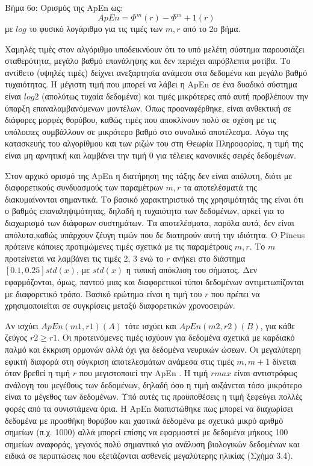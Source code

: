 \par
Βήμα 6ο: Ορισμός της \en ApEn \gr ως:
\begin{equation}
	ApEn = \Phi^m (r) - \Phi^m+1 (r)
\end{equation}
με $log$ το φυσικό λογάριθμο για τις τιμές των $m, r$ από το 2ο βήμα.
\par 
Χαμηλές τιμές στον αλγόριθμο υποδεικνύουν ότι το υπό μελέτη σύστημα παρουσιάζει σταθερότητα, μεγάλο βαθμό επανάληψης και δεν περιέχει απρόβλεπτα μοτίβα. Το αντίθετο (υψηλές τιμές) δείχνει ανεξαρτησία ανάμεσα στα δεδομένα και μεγάλο βαθμό τυχαιότητας. Η μέγιστη τιμή που μπορεί να λάβει η \en ApEn \gr σε ένα δυαδικό σύστημα είναι $log2$ (απολύτως τυχαία δεδομένα) και τιμές μικρότερες από αυτή προβλέπουν την ύπαρξη επαναλαμβανόμενων μοντέλων. Όπως προαναφέρθηκε, είναι ανθεκτική σε διάφορες μορφές θορύβου, καθώς τιμές που αποκλίνουν πολύ σε σχέση με τις υπόλοιπες συμβάλλουν σε μικρότερο βαθμό στο συνολικό αποτέλεσμα. Λόγω της κατασκευής του αλγορίθμου και των ριζών του στη Θεωρία Πληροφορίας, η τιμή της είναι μη αρνητική και λαμβάνει την τιμή 0 για τέλειες κανονικές σειρές δεδομένων.
\par
Στον αρχικό ορισμό της \en ApEn \gr η διατήρηση της τάξης δεν είναι απόλυτη, διότι με διαφορετικούς  συνδυασμούς των παραμέτρων $ m, r$ τα αποτελέσματά της διακυμαίνονται σημαντικά. Το βασικό χαρακτηριστικό της χρησιμότητάς της είναι ότι ο βαθμός επαναληψιμότητας, δηλαδή η τυχαιότητα των δεδομένων, αρκεί για το διαχωρισμό των διάφορων συστημάτων. Τα αποτελέσματα, παρόλα αυτά, δεν είναι απόλυτα,καθώς υπάρχουν ζέυγη τιμών που δε διατηρούν αυτή την ιδιότητα. Ο \en Pincus \gr πρότεινε κάποιες προτιμώμενες τιμές σχετικά με τις παραμέτρους $m, r$. Το $m$ προτείνεται να λαμβάνει τις τιμές 2, 3 ενώ το $r$ ανήκει στο διάστημα $[0.1,0.25] std(x)$, με $std(x)$ η τυπική απόκλιση του σήματος. Δεν εφαρμόζονται, όμως, παντού μιας και διαφορετικοί τύποι δεδομένων αντιμετωπίζονται με διαφορετικό τρόπο. Βασικό ερώτημα είναι η τιμή του $r$ που πρέπει να χρησιμοποιείται σε συγκρίσεις μεταξύ διαφορετικών χρονοσειρών.
\par
Αν ισχύει $ApEn(m1, r1)(A)$ τότε ισχύει και $ApEn(m2, r2)(B)$, για κάθε ζεύγος $r2 \geq r1$. Οι προτεινόμενες τιμές ισχύουν για δεδομένα σχετικά με καρδιακό παλμό και έκκριση ορμονών αλλά όχι για δεδομένα νευρικών ώσεων. Οι μεγαλύτερη εφικτή διαφορά στη σύγκριση αποτελεσμάτων ανάμεσα στις τιμές $m, m+1$ δίνεται όταν βρεθεί η τιμή $r$ που μεγιστοποιεί την \en ApEn \gr. Η τιμή $rmax$ είναι αντιστρόφως ανάλογη του μεγέθους των δεδομένων, δηλαδή όσο η τιμή αυξάνεται τόσο μικρότερο είναι το μέγεθος των δεδομένων. Υπό αυτές τις προϋποθέσεις η τιμή ξεφεύγει πολλές φορές από τα συνιστάμενα όρια. Η \en ApEn \gr διαπιστώθηκε πως μπορεί να διαχωρίσει δεδομένα με προσθήκη θορύβου και χαοτικά δεδομένα με σχετικά μικρό αριθμό σημείων (π.χ. 1000) αλλά μπορεί επίσης να εφαρμοστεί με δεδομένα μήκους 100 σημείων αναφοράς, γεγονός πολύ σημαντικό για ανάλυση βιολογικών δεδομένων και ειδικά σε περιπτώσεις που εξετάζονται ασθενείς μεγαλύτερης ηλικίας (Σχήμα 3.4).
